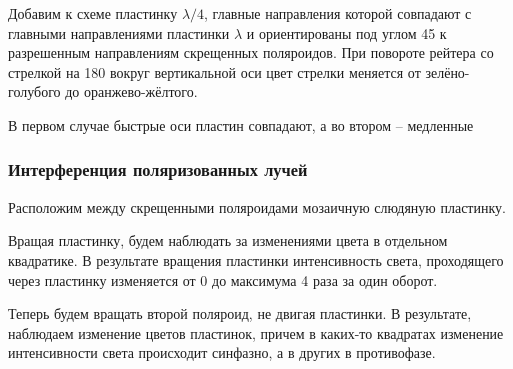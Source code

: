 \documentclass[a4paper,12pt]{article}
\begin{document}
Добавим к схеме пластинку $\lambda / 4$, главные направления которой совпадают с главными направлениями пластинки $\lambda$ и ориентированы под углом 45 \textdegree к разрешенным направлениям скрещенных поляроидов. При повороте рейтера со стрелкой на 180 \textdegree вокруг вертикальной оси цвет стрелки меняется от зелёно-голубого до оранжево-жёлтого. 

В первом случае быстрые оси пластин совпадают, а во втором -- медленные

\subsubsection*{Интерференция поляризованных лучей}

Расположим между скрещенными поляроидами мозаичную слюдяную пластинку. 

Вращая пластинку, будем наблюдать за изменениями цвета в отдельном квадратике. В результате вращения пластинки интенсивность света, проходящего через пластинку изменяется от 0 до максимума 4 раза за один оборот.

Теперь будем вращать второй поляроид, не двигая пластинки. В результате, наблюдаем изменение цветов пластинок, причем в каких-то квадратах изменение интенсивности света происходит синфазно, а в других в противофазе. 
\end{document}
